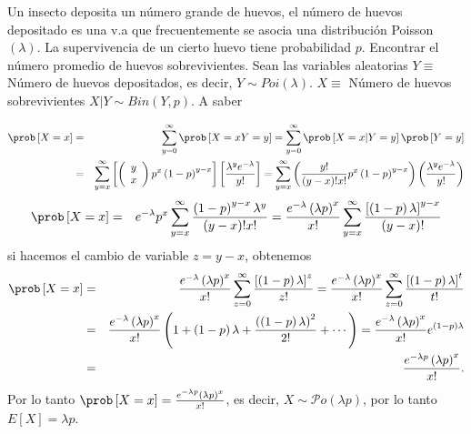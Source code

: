 \begin{Ejem} Un insecto deposita un n\'umero grande de huevos, el n\'umero de huevos depositado es una v.a que frecuentemente se asocia una distribuci\'on Poisson $\left(\lambda\right)$. La supervivencia de un cierto huevo tiene probabilidad $p$. Encontrar el n\'umero promedio de huevos sobrevivientes.
Sean las variables aleatorias
 $Y \equiv $ N\'umero de huevos depositados, es decir, $Y \sim Poi\left(\lambda\right)$. $X \equiv $ N\'umero de huevos sobrevivientes $X|Y \sim Bin\left(Y,p\right)$. A saber
 
 \begin{eqnarray*}
\prob \left[X=x\right]&=& \sum_{y=0}^{\infty}\prob \left[X=x   Y=y \right]= \sum_{y=0}^{\infty}\prob \left[X=x | Y=y \right]\prob \left[Y=y \right]\\
&=&\sum_{y=x}^{\infty} \left[ \left( 
\begin{array}{cc}
y \\ x
\end{array} \right) p^{x}\left(1-p\right)^{y-x}\right]\left[\frac{\lambda^{y}e^{-\lambda}}{y!}\right]=\sum_{y=x}^{\infty}\left( \frac{y!}{\left(y-x\right)! x!}p^{x}\left(1-p\right)^{y-x}\right)\left(\frac{\lambda^{y}e^{-\lambda}}{y!}\right)
\end{eqnarray*}
\begin{eqnarray*}
\prob \left[X=x\right] &=&e^{-\lambda}p^{x}\sum_{y=x}^{\infty}\frac{\left(1-p\right)^{y-x}\lambda^{y}}{\left(y-x\right)!x!}=\frac{e^{-\lambda}\left(\lambda p\right)^{x}}{x!} \sum_{y=x}^{\infty}\frac{\left[\left(1-p\right)\lambda\right]^{y-x}}{\left(y-x\right)!}
\end{eqnarray*}
si hacemos el cambio de variable $z=y-x$, obtenemos
\begin{eqnarray*}
\prob \left[X=x\right]&=& \frac{e^{-\lambda}\left(\lambda p\right)^{x}}{x!} \sum_{z=0}^{\infty}\frac{\left[\left(1-p\right)\lambda\right]^{z}}{z!}=\frac{e^{-\lambda}\left(\lambda p\right)^{x}}{x!}\sum_{z=0}^{\infty}\frac{\left[\left(1-p\right)\lambda\right]^{t}}{t!}\\
&=&\frac{e^{-\lambda}\left(\lambda p\right)^{x}}{x!} \left(1 + \left(1-p\right)\lambda + \frac{\left(\left(1-p\right)\lambda\right)^{2}}{2!}+ \cdots \right)=\frac{e^{-\lambda}\left(\lambda p\right)^{x}}{x!} e ^{\left(1-p\right)\lambda}\\
&=& \frac{e^{-\lambda p}\left(\lambda p\right)^{x}}{x!}.
\end{eqnarray*}
Por lo tanto 
$\prob\left[X=x\right] = \frac{e^{-\lambda p}\left(\lambda p\right)^{x}}{x!}$, es decir, $X \sim \mathcal{P}o\left(\lambda p \right)$, por lo tanto $E\left[X\right] = \lambda p$.
\end{Ejem}

